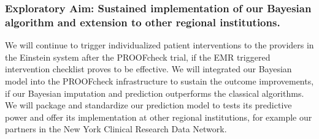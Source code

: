 \documentclass[11pt,notitlepage]{article}
\begin{document}
\subsubsection*{Exploratory Aim: Sustained implementation of our Bayesian algorithm and extension to other regional institutions.}
We will continue to trigger individualized patient interventions to the providers in the Einstein system after the PROOFcheck trial, if the EMR triggered intervention checklist proves to be effective. We will integrated our Bayesian model into the PROOFcheck infrastructure to sustain the outcome improvements, if our Bayesian imputation and prediction outperforms the classical algorithms. We will package and standardize our prediction model to tests its predictive power and offer its implementation at other regional institutions, for example our partners in the New York Clinical Research Data Network.


\newpage


\end{document}
